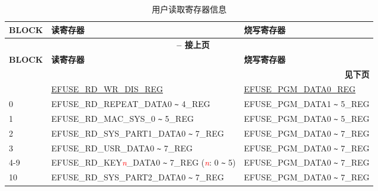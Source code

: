 \begin{longtable}[c]{|l|l|l|}
\caption{用户读取寄存器信息}
\label{tab:efuse-softw-read-para}
\\\hline
    \rowcolor{lightgray}
    \textbf{BLOCK} & \textbf{读寄存器} & \textbf{烧写寄存器}\\
    \endfirsthead    
    \multicolumn{3}{c}{\bfseries \tablename\ \thetable{} -- 接上页}\\\hline
    \rowcolor{lightgray}
    \textbf{BLOCK} & \textbf{读寄存器} & \textbf{烧写寄存器}\\
    \endhead
    \multicolumn{3}{r}{\textbf{见下页}} \\
    \endfoot
    \endlastfoot
    \hline
    0 & \hyperref[regdesc:EFUSERDWRDISREG]{EFUSE\_RD\_WR\_DIS\_REG} & \hyperref[regdesc:EFUSEPGMDATANREG]{EFUSE\_PGM\_DATA0\_REG} \\\hline
    0 & EFUSE\_RD\_REPEAT\_DATA0 \verb+~+ 4\_REG & EFUSE\_PGM\_DATA1 \verb+~+ 5\_REG \\\hline
    1 & EFUSE\_RD\_MAC\_SYS\_0 \verb+~+ 5\_REG & EFUSE\_PGM\_DATA0 \verb+~+ 5\_REG \\\hline
    2 & EFUSE\_RD\_SYS\_PART1\_DATA0 \verb+~+ 7\_REG & EFUSE\_PGM\_DATA0 \verb+~+ 7\_REG \\\hline
    3 & EFUSE\_RD\_USR\_DATA0 \verb+~+ 7\_REG & EFUSE\_PGM\_DATA0 \verb+~+ 7\_REG \\ \hline
    4-9 & EFUSE\_RD\_KEY\textcolor{red}{\it{n}}\_DATA0 \verb+~+ 7\_REG (\textcolor{red}{\it{n}}: 0 \verb+~+ 5) & EFUSE\_PGM\_DATA0 \verb+~+ 7\_REG \\\hline
    10 & EFUSE\_RD\_SYS\_PART2\_DATA0 \verb+~+ 7\_REG & EFUSE\_PGM\_DATA0 \verb+~+ 7\_REG \\\hline
\end{longtable}
